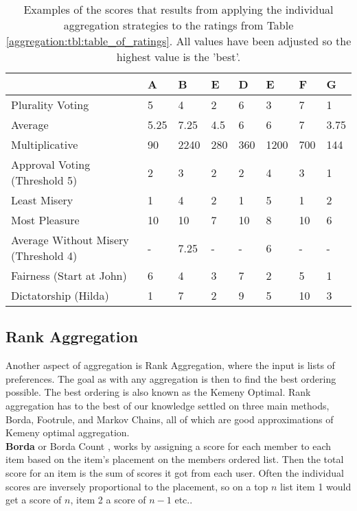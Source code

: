 \begin{table}[H]
	\centering
	\begin{tabular}{ | p{2.5cm} | p{1cm} | p{1cm} | p{1cm} | p{1cm} | p{1cm} | p{1cm} | p{1cm} | } \hline
		& \textbf{A} & \textbf{B} & \textbf{E} & \textbf{D} & \textbf{E} & \textbf{F} & \textbf{G}  \\ \hline
		Plurality Voting & 5 & 4 & 2 & 6 & 3 & 7 & 1 \\ \hline
		Average & 5.25 & 7.25 & 4.5 & 6 & 6 & 7 & 3.75 \\ \hline
		Multiplicative & 90 & 2240 & 280 & 360 & 1200 & 700 & 144 \\ \hline
		Approval Voting (Threshold 5) & 2 & 3 & 2 & 2 & 4 & 3 & 1 \\ \hline
		Least Misery & 1 & 4 & 2 & 1 & 5 & 1 & 2 \\ \hline
		Most Pleasure & 10 & 10 & 7 & 10 & 8 & 10 & 6 \\ \hline
		Average Without Misery (Threshold 4) & - & 7.25 & - & - & 6 & - & - \\ \hline
		Fairness (Start at John) & 6 & 4 & 3 & 7 & 2 & 5 & 1 \\ \hline
		Dictatorship (Hilda) & 1 & 7 & 2 & 9 & 5 & 10 & 3 \\ \hline
	\end{tabular}
	\caption{Examples of the scores that results from applying the individual aggregation strategies to the ratings from Table \ref{aggregation:tbl:table_of_ratings}. All values have been adjusted so the highest value is the 'best'.}
	\label{aggregation:tbl:examples_of_strategies}
\end{table}

\subsection{Rank Aggregation}
Another aspect of aggregation is Rank Aggregation, where the input is lists of preferences. The goal as with any aggregation is then to find the best ordering possible. The best ordering is also known as the Kemeny Optimal.
Rank aggregation has to the best of our knowledge settled on three main methods, Borda, Footrule, and Markov Chains, all of which are good approximations of Kemeny optimal aggregation.\\


\textbf{Borda} or Borda Count \cite{baltrunas} \cite{recsyshandbook}, works by assigning a score for each member to each item based on the item's placement on the members ordered list. Then the total score for an item is the sum of scores it got from each user. Often the individual scores are inversely proportional to the placement, so on a top $n$ list item 1 would get a score of $n$, item 2 a score of $n-1$ etc..\\

